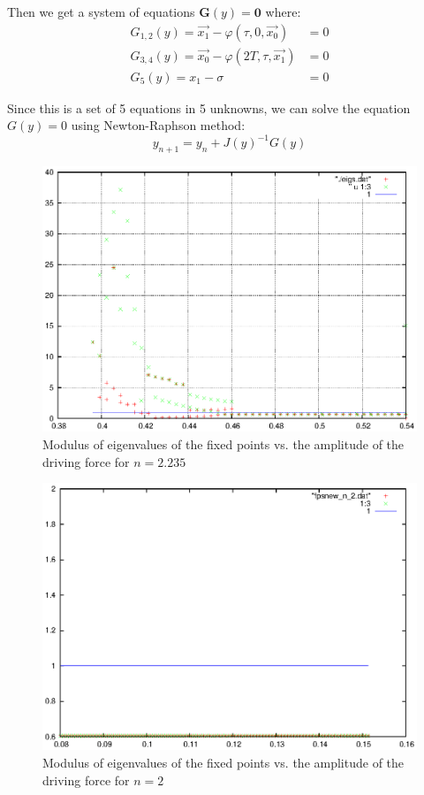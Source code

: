 \documentclass{book}
\renewcommand{\(}{\begin{columns}}
\renewcommand{\)}{\end{columns}}
\newcommand{\<}[1]{\begin{column}{#1}}
\renewcommand{\>}{\end{column}}
\newcommand{\mb}[1]{\mathbf{#1}}
\begin{document}
Then we get a system of equations $\mb{G}(y)=\mb{0}$ where:
\begin{align*}
G_{1,2}(y)=\vec{x_1}-\varphi(\tau,0,\vec{x_0})&=0\\
G_{3,4}(y)=\vec{x_0}-\varphi(2T,\tau,\vec{x_1})&=0\\
G_5(y)=x_1-\sigma&=0
\end{align*}

Since this is a set of 5 equations in 5 unknowns, we can solve the equation $G(y)=0$ using Newton-Raphson method:
\[
y_{n+1}=y_n+J(y)^{-1}G(y)
\]


\begin{figure}[!htp]
\caption{Modulus of  eigenvalues of the fixed points vs. the amplitude of the driving 
force for $n=2.235$}
\label{fig-eig-F-crude}
\begin{center}
\includegraphics[width=0.7\columnwidth]{eigvals}
\end{center}
\end{figure}

\begin{figure}[!htp]
\caption{Modulus of eigenvalues of the fixed points vs. the amplitude of the driving 
force for $n=2$}
\label{fig-eig-F-n2-crude}
\begin{center}
\includegraphics[width=0.7\columnwidth]{eigvals_n2}
\end{center}
\end{figure}
\end{document}
